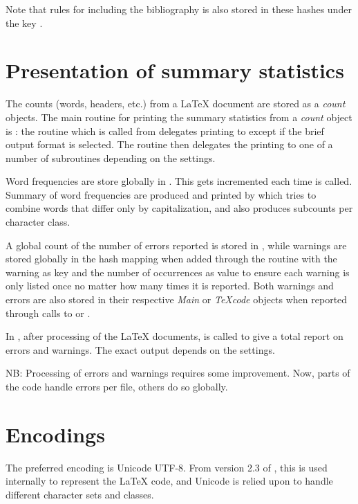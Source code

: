 \documentclass{article}
\newcommand\Obj[1]{\textsl{#1}}
\begin{document}
Note that rules for including the bibliography is also stored in these hashes under the key .



\section{Presentation of summary statistics}

The counts (words, headers, etc.) from a \LaTeX{} document are stored as a \Obj{count} objects. The main routine for printing the summary statistics from a \Obj{count} object is : the routine  which is called from  delegates printing to  except if the brief output format is selected. The  routine then delegates the printing to one of a number of subroutines depending on the settings.

Word frequencies are store globally in . This gets incremented each time  is called. Summary of word frequencies are produced and printed by  which tries to combine words that differ only by capitalization, and also produces subcounts per character class.

A global count of the number of errors reported is stored in , while warnings are stored globally in the  hash mapping when added through the  routine with the warning as key and the number of occurrences as value to ensure each warning is only listed once no matter how many times it is reported. Both warnings and errors are also stored in their respective \Obj{Main} or \Obj{TeXcode} objects when reported through calls to  or .

In , after processing of the \LaTeX{} documents,  is called to give a total report on errors and warnings. The exact output depends on the settings. 

NB: Processing of errors and warnings requires some improvement. Now, parts of the code handle errors per file, others do so globally.



\section{Encodings}

The preferred encoding is Unicode UTF-8. From version 2.3 of \TeXcount{}, this is used internally to represent the \LaTeX{} code, and Unicode is relied upon to handle different character sets and classes.
\end{document}
